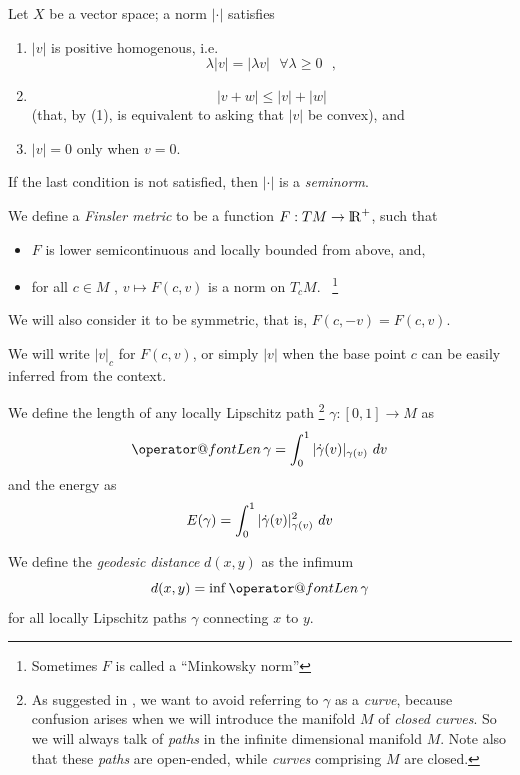 \documentclass[twoside,a4paper,english]{article}
\makeatletter
\def\Len{\mathop{\operator@font Len}\nolimits}
\makeatother
\begin{document}
\begin{Definition}\label{def: norm}
  Let $X$ be a vector space; a norm $|\cdot|$ satisfies
  \begin{enumerate}
  \item $|v|$ is positive homogenous, i.e.
    $$ \lambda |v| = | \lambda v|~~~\forall \lambda \ge 0~~~,$$
  \item  
    \[ |v+w|\le |v|+|w|\]
    (that, by (1), is equivalent to asking that $|v|$ be convex), and
  \item $|v|=0$ only when $v=0$.
  \end{enumerate}
\end{Definition}
If the last condition is not satisfied, then  $|\cdot|$ is a 
\emph{seminorm}.
\begin{Definition}\label{def: Finsler}
  We define a \emph{Finsler metric} to be a  
  function $F:TM\to{\protect\mathrm{l\hskip-0.15em R}}^+$,  such that
  \begin{itemize}
  \item $F$ is lower semicontinuous and locally bounded from above,
     and,
  \item 
    for all $c\in M$ , $v\mapsto F(c,v)$ is a  norm on
    $T_cM$.~%
    \footnote{Sometimes $F$ is called a ``Minkowsky norm''}
\end{itemize}


  We will also consider it to be symmetric, that is, $F(c,-v)=F(c,v)$.
\end{Definition}

We will write $|v|_c$ for $F(c,v)$, or simply $|v|$ when the base
point $c$ can be easily inferred from the context.

We define the length of any  locally Lipschitz path%
\footnote{As suggested in \cite{Michor-Mumford},
  we want to avoid referring to $\gamma$ as a \emph{curve}, because 
  confusion arises when we will introduce the manifold $M$ of 
  \emph{closed curves}.
  So  we will always talk of \emph{paths} in the infinite dimensional manifold
  $M$.
  Note also that these \emph{paths} are open-ended, 
  while \emph{curves} comprising $M$ are closed.
}
$\gamma:[0,1]\to M$ as
$$\Len \gamma =  \int_0^1 |\overdot \gamma(v)|_{\gamma(v)} ~dv$$
and the energy as
$$E(\gamma)=\int_0^1 |\overdot \gamma(v)|_{\gamma(v)}^2 ~dv$$



\smallskip 

We define the \emph{geodesic distance}
$d(x,y)$ as the infimum
\begin{equation}
d(x,y)=\inf \Len \gamma\label{eq: def d}
\end{equation}
for all locally Lipschitz paths $\gamma$ connecting $x$ to $y$.
\end{document}
